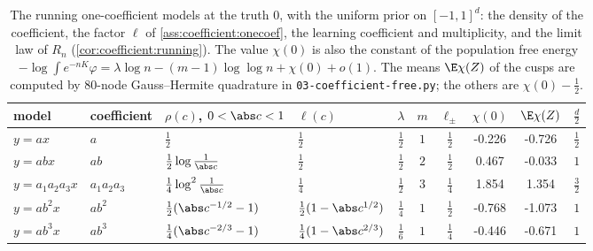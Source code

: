 \begin{refsection}

\begin{table}[t]
\begin{fullwidth}
\centering\small
\setlength{\tabcolsep}{5pt}
\begin{tabular}{@{}llllcccS[table-format=-1.3]S[table-format=-1.3]c@{}}
\toprule
model & coefficient & $\rho(c)$, $0<\abs c<1$ & $\ell(c)$ & $\lambda$ & $m$ & $\ell_\pm$ & {$\chi(0)$} & {$\E\chi(Z)$} & $\tfrac d2$\\
\midrule
$y=ax$ & $a$ & $\frac12$ & $\frac12$ & $\frac12$ & $1$ & $\frac12$ & -0.226 & -0.726 & $\frac12$\\
$y=abx$ & $ab$ & $\frac12\log\frac1{\abs c}$ & $\frac12$ & $\frac12$ & $2$ & $\frac12$ & 0.467 & -0.033 & $1$\\
$y=a_1a_2a_3x$ & $a_1a_2a_3$ & $\frac14\log^2\frac1{\abs c}$ & $\frac14$ & $\frac12$ & $3$ & $\frac14$ & 1.854 & 1.354 & $\frac32$\\
$y=ab^2x$ & $ab^2$ & $\frac12(\abs c^{-1/2}-1)$ & $\frac12(1-\abs c^{1/2})$ & $\frac14$ & $1$ & $\frac12$ & -0.768 & -1.073 & $1$\\
$y=ab^3x$ & $ab^3$ & $\frac14(\abs c^{-2/3}-1)$ & $\frac14(1-\abs c^{2/3})$ & $\frac16$ & $1$ & $\frac14$ & -0.446 & -0.671 & $1$\\
\bottomrule
\end{tabular}
\end{fullwidth}
\caption{The running one-coefficient models at the truth $0$, with the uniform prior on $[-1,1]^d$: the density of the coefficient, the factor $\ell$ of \cref{ass:coefficient:onecoef}, the learning coefficient and multiplicity, and the limit law of $R_n$ (\cref{cor:coefficient:running}). The value $\chi(0)$ is also the constant of the population free energy $-\log\int e^{-nK}\varphi=\lambda\log n-(m-1)\log\log n+\chi(0)+o(1)$. The means $\E\chi(Z)$ of the cusps are computed by $80$-node Gauss--Hermite quadrature in \texttt{03-coefficient-free.py}; the others are $\chi(0)-\frac12$.}\label{tab:coefficient:running}
\end{table}


\end{refsection}
